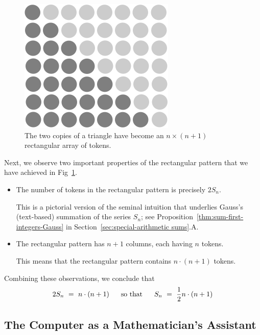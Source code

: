 \begin{figure}[ht]
\begin{center}
       \includegraphics[scale=0.35]{FiguresMaths/SumIntegersFinal}
\caption{The two copies of a triangle have become an $n \times (n+1)$
  rectangular array of tokens.}
       \label{fig:sumIntegers3}
\end{center}
\end{figure}
Next, we observe two important properties of the rectangular pattern that we have achieved in Fig~\ref{fig:sumIntegers3}.
\begin{itemize}
\item
The number of tokens in the rectangular pattern is precisely $2 S_n$.

\smallskip

This is a pictorial version of the seminal intuition that underlies Gauss's (text-based) summation of the series $S_n$; see Proposition~\ref{thm:sum-first-integers-Gauss} in Section~\ref{sec:special-arithmetic sums}.A.

\item
The rectangular pattern has $n+1$ columns, each having $n$ tokens.

\smallskip

This means that the rectangular pattern contains $n \cdot (n+1)$ tokens.
\end{itemize}
Combining these observations, we conclude that
\[ 2 S_n \ = \ n \cdot (n+1) \ \ \ \ \mbox{ so that } \ \ \ \
S_n \ = \ {1 \over 2} n \cdot (n+1)
\]


\subsection{The Computer as a Mathematician's Assistant}

